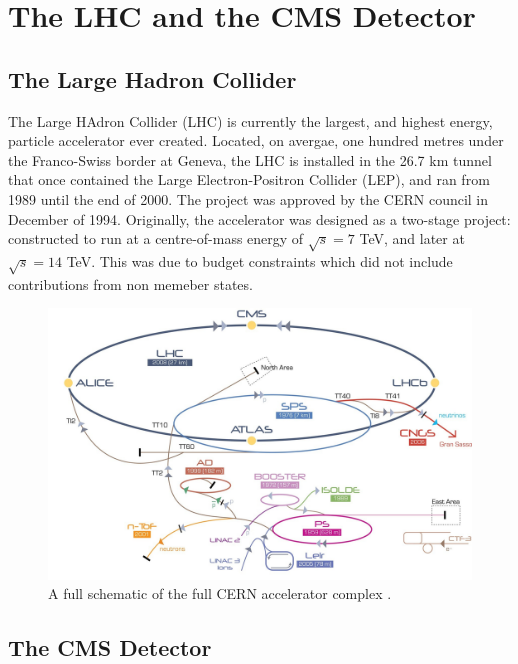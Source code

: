 \chapter{The LHC and the CMS Detector} \label{chap-detector}

\section{The Large Hadron Collider} \label{sec-TheLargeHadronCollider}

The Large HAdron Collider (LHC) is currently the largest, and highest energy, particle accelerator ever created. Located, on avergae, one hundred metres under the Franco-Swiss border at Geneva, the LHC is installed in the 26.7 km tunnel that once contained the Large Electron-Positron Collider (LEP), and ran from 1989 until the end of 2000. The project was approved by the CERN council in December of 1994. Originally, the accelerator was designed as a two-stage project: constructed to run at a centre-of-mass energy of $\sqrt{s}=7$ TeV, and later at $\sqrt{s}=14$ TeV. This was due to budget constraints which did not include contributions from non memeber states.   

\begin{figure}\label{fig-CERNAcceleratorComplex}
\includegraphics[width=\textwidth]{Figures/CERNAcceleratorComplex.jpg}
\caption{A full schematic of the full CERN accelerator complex \cite{}.}
\end{figure}

\section{The CMS Detector} \label{sec-TheCMSDetector}

